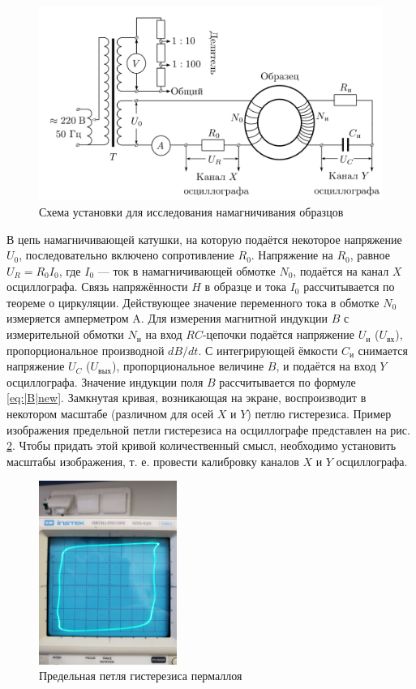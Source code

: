 \documentclass[a4paper, 12pt]{article}
\begin{document}
\begin{figure}[h!]
	\centering
	\includegraphics[scale=2]{3.png}
	\caption{ Схема установки для исследования намагничивания образцов}
	\label{fig:scheme}
\end{figure}

В цепь намагничивающей катушки, на которую подаётся некоторое
напряжение $U_0$, последовательно включено сопротивление $R_0$. Напряжение на $R_0$, равное $U_R = R_0I_0$, где $I_0$ — ток в намагничивающей обмотке $N_0$, подаётся на канал $ X $ осциллографа. Связь напряжённости $ H $ в
образце и тока $I_0$ рассчитывается по теореме о циркуляции. Действующее значение переменного тока в обмотке $N_0$ измеряется амперметром A. Для измерения магнитной индукции $ B $ с измерительной обмотки $N_\text{и}$ на вход $ RC $-цепочки подаётся напряжение $U_\text{и}$ ($U_{\text{вх}}$), пропорциональное производной $ dB/dt $. С интегрирующей ёмкости $C_\text{и}$ снимается напряжение $U_C$ ($U_{\text{вых}}$), пропорциональное величине $ B $, и подаётся на вход $ Y $ осциллографа. Значение индукции поля $ B $ рассчитывается по формуле \eqref{eq:|B|new}. Замкнутая кривая, возникающая на экране, воспроизводит в некотором масштабе (различном для осей $ X $ и $ Y $) петлю гистерезиса. Пример изображения предельной петли гистерезиса на осциллографе представлен на рис. \ref{fig:Perm:petlya}. Чтобы придать этой кривой количественный смысл, необходимо установить масштабы изображения, т. е. провести калибровку каналов $ X $ и $ Y $ осциллографа.

\begin{figure}[h]
\begin{center}
    \includegraphics[width=0.4\textwidth]{perm.jpg}
\end{center}
\caption{Предельная петля гистерезиса пермаллоя}
\label{fig:Perm:petlya}
\end{figure}
  	
\end{document}
